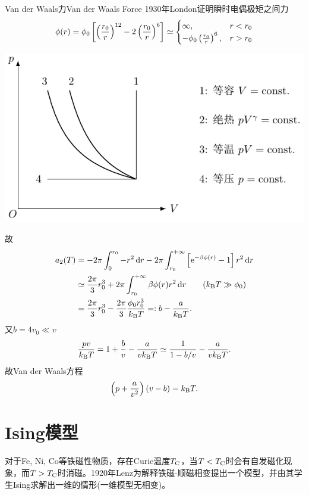 \begin{example}{Van der Waals力}{Van der Waals Force}
	1930年London证明瞬时电偶极矩之间力
	\begin{equation}
		\phi(r)=\phi_0\left[\left(\frac{r_0}r\right)^{12}-2\left(\frac{r_0}r\right)^6\right]\simeq\begin{cases}
			\infty,&r<r_0\\
			-\phi_0\left(\frac{r_0}r\right)^6,&r>r_0
		\end{cases}
	\end{equation}
	\begin{center}
		\includegraphics[page=25]{figures/tikz/coordinates.pdf}
		\label{fig:phi(r)}
	\end{center}
	故
	{\begin{align*}
		a_2(T)&=-2\pi\int_0^{r_0}-r^2\d r-2\pi\int_{r_0}^{+\infty}\fkh{\e{-\beta\phi(r)}-1}r^2\d r\\
		&\simeq\frac{2\pi}3r_0^3+2\pi\int_{r_0}^{+\infty}\beta\phi(r)r^2\d r\tag{$\kB T\gg\phi_0$}\\
		&=\frac{2\pi}3r_0^3-\frac{2\pi}3\frac{\phi_0r_0^3}{\kB T}=:b-\frac a{\kB T}.
	\end{align*}}
	又$b=4v_0\ll v$
	\[
		\frac{pv}{k_{\mathrm B} T}=1+\frac bv-\frac a{vk_{\mathrm B} T}\simeq\frac1{1-b/v}-\frac a{vk_{\mathrm B} T}.
	\]
	故Van der Waals方程
	\begin{align}
		\left(p+\frac a{v^2}\right)(v-b)=k_{\mathrm B} T.
	\end{align}
\end{example}
\section{Ising模型}
对于Fe, Ni, Co等铁磁性物质，存在Curie温度$T_\mathrm C$，当$T<T_\mathrm C$时会有自发磁化现象，而$T>T_\mathrm C$时消磁。1920年Lenz为解释铁磁-顺磁相变提出一个模型，并由其学生Ising求解出一维的情形(一维模型无相变)。

